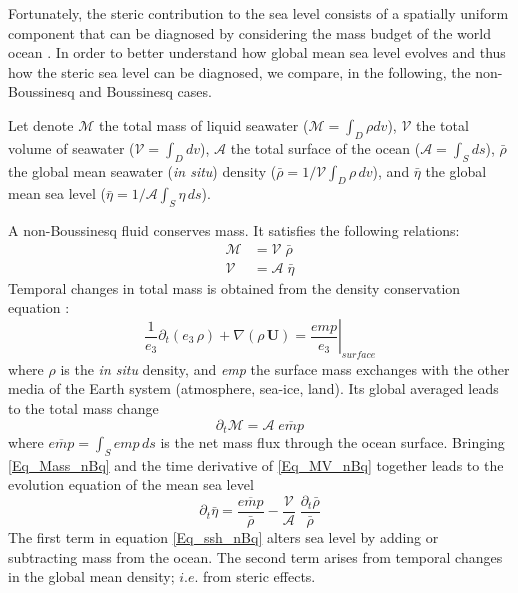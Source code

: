 \documentclass[NEMO_book]{subfiles}
\begin{document}
Fortunately, the steric contribution to the sea level consists of a spatially uniform 
component that can be diagnosed by considering the mass budget of the world 
ocean \citep{Greatbatch_JGR94}. 
In order to better understand how global mean sea level evolves and thus how
the steric sea level can be diagnosed, we compare, in the following, the 
non-Boussinesq and Boussinesq cases.

Let denote 
$\mathcal{M}$ the total mass of liquid seawater ($\mathcal{M}=\int_D \rho dv$), 
$\mathcal{V}$ the total volume of seawater ($\mathcal{V}=\int_D dv$), 
$\mathcal{A}$ the total surface of the ocean ($\mathcal{A}=\int_S ds$), 
$\bar{\rho}$ the global mean seawater (\textit{in situ}) density ($\bar{\rho}= 1/\mathcal{V} \int_D \rho \,dv$), and
$\bar{\eta}$ the global mean sea level ($\bar{\eta}=1/\mathcal{A}\int_S \eta \,ds$).

A non-Boussinesq fluid conserves mass. It satisfies the following relations:
\begin{equation} \label{Eq_MV_nBq} 
\begin{split} 
\mathcal{M} &=  \mathcal{V}  \;\bar{\rho}      	\\
\mathcal{V} &=  \mathcal{A}  \;\bar{\eta}	
\end{split}
\end{equation}
Temporal changes in total mass is obtained from the density conservation equation :
\begin{equation}  \label{Eq_Co_nBq}
\frac{1}{e_3} \partial_t ( e_3\,\rho) + \nabla( \rho \, \textbf{U} ) = \left. \frac{\textit{emp}}{e_3}\right|_\textit{surface}
\end{equation}
where $\rho$ is the \textit{in situ} density, and \textit{emp} the surface mass 
exchanges with the other media of the Earth system (atmosphere, sea-ice, land). 
Its global averaged leads to the total mass change 
\begin{equation}  \label{Eq_Mass_nBq}
\partial_t \mathcal{M} = \mathcal{A} \;\overline{\textit{emp}}
\end{equation}
where $\overline{\textit{emp}}=\int_S \textit{emp}\,ds$ is the net mass flux 
through the ocean surface.
Bringing \eqref{Eq_Mass_nBq} and the time derivative of \eqref{Eq_MV_nBq} 
together leads to the evolution equation of the mean sea level
\begin{equation} \label{Eq_ssh_nBq}
  \partial_t \bar{\eta} =  \frac{\overline{\textit{emp}}}{ \bar{\rho}} 
  					- \frac{\mathcal{V}}{\mathcal{A}}  \;\frac{\partial_t \bar{\rho} }{\bar{\rho}}
\end{equation}
The first term in equation \eqref{Eq_ssh_nBq} alters sea level by adding or 
subtracting mass from the ocean. 
The second term arises from temporal changes in the global mean 
density; $i.e.$ from steric effects. 
\end{document}
